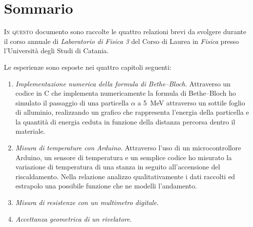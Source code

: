 \chapter{Sommario}
    \lettrine[loversize=0.08, lines=2]{I}{n questo} documento sono raccolte le quattro relazioni brevi da svolgere durante il corso annuale di \emph{Laboratorio di Fisica 3} del Corso di Laurea in \emph{Fisica} presso l'Università degli Studi di Catania.

    Le esperienze sono esposte nei quattro capitoli seguenti:
    \begin{enumerate}
        \item \emph{Implementazione numerica della formula di Bethe--Bloch}. Attraverso un codice in C che implementa numericamente la formula di Bethe--Bloch ho simulato il passaggio di una particella $\alpha$ a \SI{5}{\mega\eV} attraverso un sottile foglio di alluminio, realizzando un grafico che rappresenta l'energia della particella e la quantità di energia ceduta in funzione della distanza percorsa dentro il materiale.
        \item \emph{Misura di temperature con Arduino}. Attraverso l'uso di un microcontrollore Arduino, un sensore di temperatura e un semplice codice ho misurato la variazione di temperatura di una stanza in seguito all'accensione del riscaldamento. Nella relazione analizzo qualitativamente i dati raccolti ed estrapolo una possibile funzione che ne modelli l'andamento.
        \item \emph{Misura di resistenze con un multimetro digitale}.
        \item \emph{Accettanza geometrica di un rivelatore}.
    \end{enumerate} 